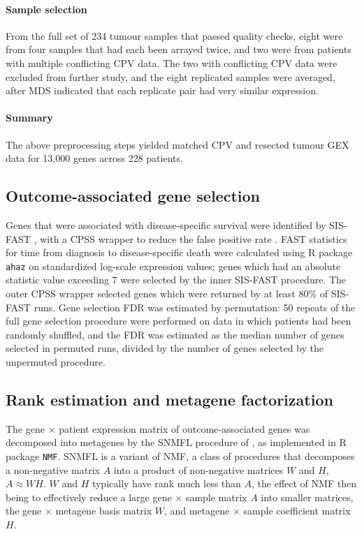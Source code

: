 \documentclass[dissertation.tex]{subfiles}
\begin{document}
\paragraph{Sample selection}  From the full set of 234 tumour samples that passed quality checks, eight were from four samples that had each been arrayed twice, and two were from patients with multiple conflicting \gls{CPV} data.  The two with conflicting \gls{CPV} data were excluded from further study, and the eight replicated samples were averaged, after \gls{MDS} indicated that each replicate pair had very similar expression.

\paragraph{Summary}
The above preprocessing steps yielded matched \gls{CPV} and resected tumour \gls{GEX} data for 13,000 genes across 228 patients.

\subsection{Outcome-associated gene selection}
Genes that were associated with disease-specific survival were identified by \gls{SIS}-\gls{FAST} \cite{Gorst-Rasmussen2013}, with a \gls{CPSS} wrapper to reduce the false positive rate \cite{Shah2013}.  \gls{FAST} statistics for time from diagnosis to disease-specific death were calculated using R package \texttt{ahaz} on standardized log-scale expression values; genes which had an absolute statistic value exceeding 7 were selected by the inner \gls{SIS}-\gls{FAST} procedure.  The outer \gls{CPSS} wrapper selected genes which were returned by at least 80\% of \gls{SIS}-\gls{FAST} runs.  Gene selection \gls{FDR} was estimated by permutation: 50 repeats of the full gene selection procedure were performed on data in which patients had been randomly shuffled, and the \gls{FDR} was estimated as the median number of genes selected in permuted runs, divided by the number of genes selected by the unpermuted procedure.

\subsection{Rank estimation and metagene factorization}
\label{subsec:sigs-nmf}
The gene $\times$ patient expression matrix of outcome-associated genes was decomposed into metagenes by the \gls{SNMFL} procedure of \cite{Kim2007}, as implemented in R package \texttt{NMF}.  \gls{SNMFL} is a variant of \gls{NMF}, a class of procedures that decomposes a non-negative matrix $A$ into a product of non-negative matrices $W$ and $H$, $A \approx WH$.  $W$ and $H$ typically have rank much less than $A$, the effect of \gls{NMF} then being to effectively reduce a large gene $\times$ sample matrix $A$ into smaller matrices, the gene $\times$ metagene basis matrix $W$, and metagene $\times$ sample coefficient matrix $H$.
\end{document}
